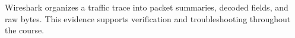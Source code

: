 \begin{chapterrecap}
Wireshark organizes a traffic trace into packet summaries, decoded fields, and raw bytes. This evidence supports verification and troubleshooting throughout the course.
\end{chapterrecap}


